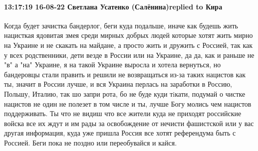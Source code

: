  
 
 
 
 

\paragraph{13:17:19 16-08-22 Светлана Усатенко (Салёнина)replied to Кира}

Когда будет зачистка бандерлог, беги куда подальше, иначе как будешь жить
нацисткая ядовитая змея среди мирных добрых людей которые хотят жить мирно на
Украине и не скакать на майдане, а просто жить и дружить с Россией, так как у
всех родственники, дети везде в России или на Украине, да да, как и раньше не
"в" а "на" Украине, я на такой Украине выросла и хотела вернуться, но
бандеровцы стали править и решили не возвращаться из-за таких нацистов как ты,
значит в России лучше, и вся Украина перлась на заработки в Россию, Польшу,
Италию, так шо запри рота, бо не буде куди тiкати, подумай о чистке нацистов не
один не полезет в том числе и ты, лучше Богу молись чем нацистов поддерживать.
Ты что не видиш что все жители куда не приходят российские войска все их ждут и
им рады за освобождение от нечисти фашистской или у вас другая информация, куда
уже пришла Россия все хотят референдума быть с Россией. Беги пока не поздно или
переобувайся и кайся.


